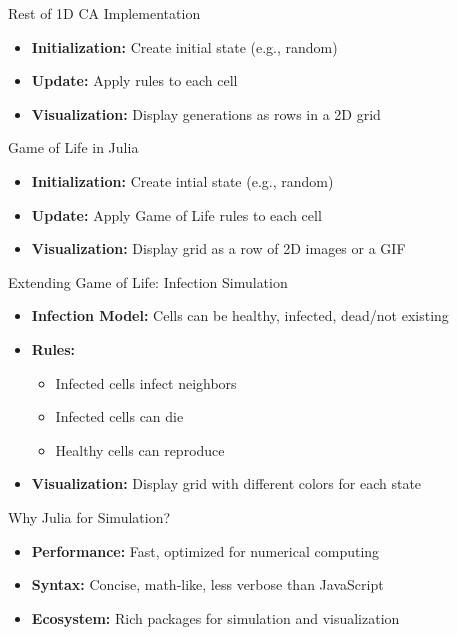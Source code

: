 \begin{frame}{Rest of 1D CA Implementation}
    \begin{itemize}
        \item \textbf{Initialization:} Create initial state (e.g., random)
        \item \textbf{Update:} Apply rules to each cell
        \item \textbf{Visualization:} Display generations as rows in a 2D grid
    \end{itemize}
\end{frame}

\begin{frame}{Game of Life in Julia}
    \begin{itemize}
        \item \textbf{Initialization:} Create intial state (e.g., random)
        \item \textbf{Update:} Apply Game of Life rules to each cell
        \item \textbf{Visualization:} Display grid as a row of 2D images or a GIF
    \end{itemize}

\end{frame}

\begin{frame}{Extending Game of Life: Infection Simulation}
    \begin{itemize}
        \item \textbf{Infection Model:} Cells can be healthy, infected, dead/not existing
        \item \textbf{Rules:}
              \begin{itemize}
                  \item Infected cells infect neighbors
                  \item Infected cells can die
                  \item Healthy cells can reproduce
              \end{itemize}
        \item \textbf{Visualization:} Display grid with different colors for each state
    \end{itemize}

\end{frame}


\begin{frame}{Why Julia for Simulation?}
    \begin{itemize}
        \item \textbf{Performance:} Fast, optimized for numerical computing
        \item \textbf{Syntax:} Concise, math-like, less verbose than JavaScript
        \item \textbf{Ecosystem:} Rich packages for simulation and visualization
    \end{itemize}
\end{frame}


